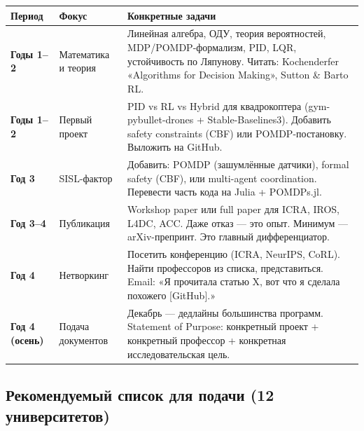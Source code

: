 \documentclass[10pt, a4paper]{article}
\begin{document}
\begin{center}
\begin{tabular}{>{\bfseries}p{2.8cm} p{3.5cm} p{8.5cm}}
\toprule
Период & Фокус & Конкретные задачи \\
\midrule
Годы 1--2 & Математика и теория &
  Линейная алгебра, ОДУ, теория вероятностей, MDP/POMDP-формализм, PID, LQR, устойчивость по Ляпунову. Читать: Kochenderfer «Algorithms for Decision Making», Sutton \& Barto RL. \\
\midrule
Годы 1--2 & Первый проект &
  PID vs RL vs Hybrid для квадрокоптера (gym-pybullet-drones + Stable-Baselines3). Добавить safety constraints (CBF) или POMDP-постановку. Выложить на GitHub. \\
\midrule
Год 3 & SISL-фактор &
  Добавить: POMDP (зашумлённые датчики), formal safety (CBF), или multi-agent coordination. Перевести часть кода на Julia + POMDPs.jl. \\
\midrule
Год 3--4 & Публикация &
  Workshop paper или full paper для ICRA, IROS, L4DC, ACC. Даже отказ — это опыт. Минимум — arXiv-препринт. Это главный дифференциатор. \\
\midrule
Год 4 & Нетворкинг &
  Посетить конференцию (ICRA, NeurIPS, CoRL). Найти профессоров из списка, представиться. Email: «Я прочитала статью X, вот что я сделала похожего [GitHub].» \\
\midrule
Год 4 (осень) & Подача документов &
  Декабрь — дедлайны большинства программ. Statement of Purpose: конкретный проект + конкретный профессор + конкретная исследовательская цель. \\
\bottomrule
\end{tabular}
\end{center}

\subsection{Рекомендуемый список для подачи (12 университетов)}
\end{document}

